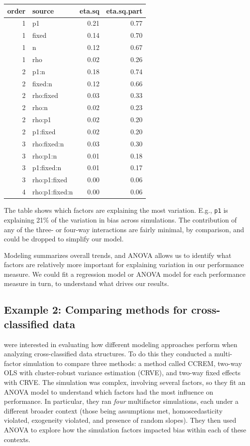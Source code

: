 \documentclass[
]{book}
\begin{document}
\begin{tabular}{r|l|r|r}
\hline
order & source & eta.sq & eta.sq.part\\
\hline
1 & p1 & 0.21 & 0.77\\
\hline
1 & fixed & 0.14 & 0.70\\
\hline
1 & n & 0.12 & 0.67\\
\hline
1 & rho & 0.02 & 0.26\\
\hline
2 & p1:n & 0.18 & 0.74\\
\hline
2 & fixed:n & 0.12 & 0.66\\
\hline
2 & rho:fixed & 0.03 & 0.33\\
\hline
2 & rho:n & 0.02 & 0.23\\
\hline
2 & rho:p1 & 0.02 & 0.20\\
\hline
2 & p1:fixed & 0.02 & 0.20\\
\hline
3 & rho:fixed:n & 0.03 & 0.30\\
\hline
3 & rho:p1:n & 0.01 & 0.18\\
\hline
3 & p1:fixed:n & 0.01 & 0.17\\
\hline
3 & rho:p1:fixed & 0.00 & 0.06\\
\hline
4 & rho:p1:fixed:n & 0.00 & 0.06\\
\hline
\end{tabular}

The table shows which factors are explaining the most variation. E.g., \texttt{p1} is explaining 21\% of the variation in bias across simulations.
The contribution of any of the three- or four-way interactions are fairly minimal, by comparison, and could be dropped to simplify our model.

Modeling summarizes overall trends, and ANOVA allows us to identify what factors are relatively more important for explaining variation in our performance measure.
We could fit a regression model or ANOVA model for each performance measure in turn, to understand what drives our results.

\subsection{Example 2: Comparing methods for cross-classified data}\label{example-2-comparing-methods-for-cross-classified-data}

\citet{lee2023comparing} were interested in evaluating how different modeling approaches perform when analyzing cross-classified data structures.
To do this they conducted a multi-factor simulation to compare three methods: a method called CCREM, two-way OLS with cluster-robust variance estimation (CRVE), and two-way fixed effects with CRVE.
The simulation was complex, involving several factors, so they fit an ANOVA model to understand which factors had the most influence on performance.
In particular, they ran \emph{four} multifactor simulations, each under a different broader context (those being assumptions met, homoscedasticity violated, exogeneity violated, and presence of random slopes).
They then used ANOVA to explore how the simulation factors impacted bias within each of these contexts.
\end{document}
